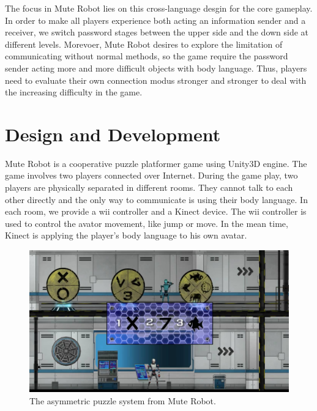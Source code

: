 \documentclass{chi-ext}
\begin{document}
The focus in Mute Robot lies on this cross-language desgin for the core gameplay.
In order to make all players experience both acting an information sender and a receiver, we switch password stages between the upper side and the down side at different levels.
Morevoer, Mute Robot desires to explore the limitation of communicating without normal methods, so the game require the password sender acting more and more difficult objects with body language.
Thus, players need to evaluate their own connection modus stronger and stronger to deal with the increasing difficulty in the game. 

 
  
\section{Design and Development}
Mute Robot is a cooperative puzzle platformer game using Unity3D\cite{Unity3D} engine. The game involves two players connected over Internet. During the game play, two players are physically separated in different rooms. 
They cannot talk to each other directly and the only way to communicate is using their body language. 
In each room, we provide a wii\cite{Wii} controller and a Kinect\cite{Kinect} device. 
The wii controller is used to control the avator movement, like jump or move. 
In the mean time, Kinect is applying the player's body language to his own avatar. 


\begin{figure}
  \centering
  \includegraphics[width=\linewidth]{figures/Figure1.jpg}
  \caption{The asymmetric puzzle system from Mute Robot.}
  \label{fig:Figure1}
\end{figure}
\end{document}

